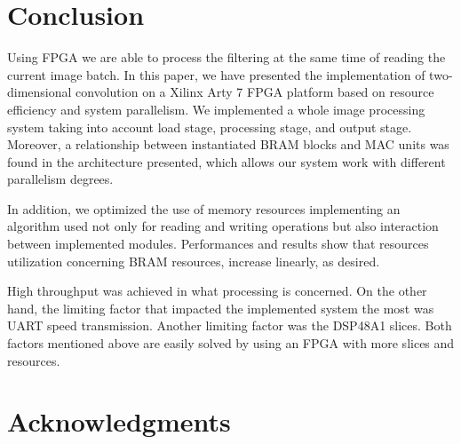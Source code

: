 \documentclass[conference,compsoc]{IEEEtran}
\begin{document}




\section{Conclusion}\label{sec:conclusion}

Using FPGA we are able to process the filtering at the same time of reading the current image batch. 
In this paper, we have presented the implementation of two-dimensional
convolution on a Xilinx Arty 7 FPGA platform based on resource efficiency and system parallelism.
We implemented a whole image processing system taking into account load stage, processing
stage, and output stage. Moreover, a relationship between instantiated BRAM blocks and MAC units was found in the architecture
presented, which allows our system work with different parallelism degrees. 

In addition, we optimized the use of  memory resources implementing an algorithm
used not only for reading and writing operations but also interaction between implemented modules. 
Performances and results show that resources utilization concerning BRAM resources, increase linearly, as desired.

High throughput was achieved in what processing  is concerned. On the other hand, the limiting factor that impacted
 the implemented system the most was UART speed transmission. Another limiting factor was the DSP48A1 slices.
Both factors mentioned above are easily solved by using an FPGA with more slices and resources.






\ifCLASSOPTIONcompsoc
  \section*{Acknowledgments}
\else
\end{document}

